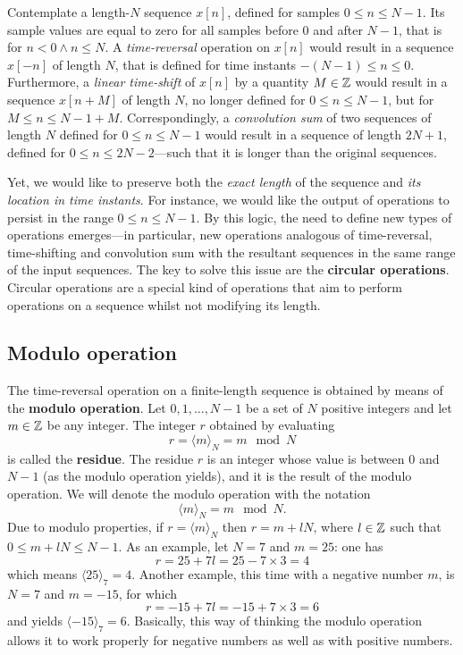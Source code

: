 \documentclass[\documentfontsize, twocolumn]{\classname}
\begin{document}
Contemplate a length-$N$ sequence $x[n]$, defined for samples $0\leq n \leq N-1$. Its sample values are equal to zero for all samples before $0$ and after $N-1$, that is for $n < 0 \wedge n \leq N$. A \emph{time-reversal} operation on $x[n]$ would result in a sequence $x[-n]$ of length $N$, that is defined for time instants $-(N-1) \leq n \leq 0$. Furthermore, a \emph{linear time-shift} of $x[n]$ by a quantity $M \in \mathbb Z$ would result in a sequence $x[n+M]$ of length $N$, no longer defined for $0 \leq n \leq N-1$, but for $M \leq n \leq N-1 + M$. Correspondingly, a \emph{convolution sum} of two sequences of length $N$ defined for $0 \leq n \leq N-1$ would result in a sequence of length $2N + 1$, defined for $0 \leq n \leq 2N-2$---such that it is longer than the original sequences.

Yet, we would like to preserve both the \emph{exact length} of the sequence and \emph{its location in time instants}. For instance, we would like the output of operations to persist in the range $0 \leq n \leq N-1$. By this logic, the need to define new types of operations emerges---in particular, new operations analogous of time-reversal, time-shifting and convolution sum with the resultant sequences in the same range of the input sequences. The key to solve this issue are the \textbf{circular operations}. Circular operations are a special kind of operations that aim to perform operations on a sequence whilst not modifying its length.

\subsection{Modulo operation}
The time-reversal operation on a finite-length sequence is obtained by means of the \textbf{modulo operation}. Let $0,1,\dots, N - 1$ be a set of $N$ positive integers and let $m \in \mathbb Z$ be any integer. The integer $r$ obtained by evaluating
\begin{equation}\label{eqn:moduloOperation}
    r = \langle m \rangle_N = m \mod N
\end{equation}
is called the \textbf{residue}. The residue $r$ is an integer whose value is between $0$ and $N-1$ (as the modulo operation yields), and it is the result of the modulo operation. We will denote the modulo operation with the notation \[ \langle m \rangle_N = m \mod N. \] Due to modulo properties, if $r = \langle m \rangle_N$ then $r = m + lN$, where $l \in \mathbb Z$ such that $0 \leq m + lN \leq N-1$.
As an example, let $N=7$ and $m = 25$: one has
\[
    r = 25 + 7l = 25 - 7 \times 3 = 4
\]
which means $\langle 25 \rangle_7 = 4$. Another example, this time with a negative number $m$, is $N=7$ and $m=-15$, for which
\[
    r = -15 + 7l = -15 + 7 \times 3 = 6
\]
and yields $\langle -15 \rangle_7 = 6$. Basically, this way of thinking the modulo operation allows it to work properly for negative numbers as well as with positive numbers.
\end{document}
